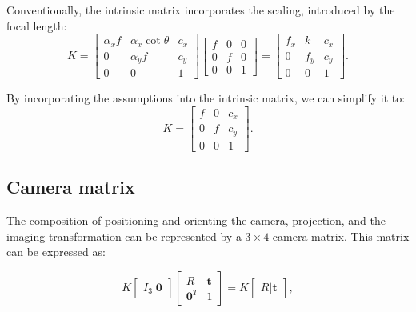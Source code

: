 Conventionally, the intrinsic matrix incorporates the scaling, introduced
by the focal length:
\begin{equation}
	K = \begin{bmatrix}
		\alpha_x f & \alpha_x \cot \theta & c_x \\
		0          & \alpha_y f           & c_y \\
		0          & 0                    & 1
	\end{bmatrix} \begin{bmatrix}
		f & 0 & 0 \\
		0 & f & 0 \\
		0 & 0 & 1
	\end{bmatrix} = \begin{bmatrix}
		f_x & k   & c_x \\
		0   & f_y & c_y \\
		0   & 0   & 1
	\end{bmatrix}.
\end{equation}

By incorporating the assumptions  into the intrinsic matrix,
we can simplify it to:
\begin{equation}
	K = \begin{bmatrix}
		f & 0 & c_x \\
		0 & f & c_y \\
		0 & 0 & 1
	\end{bmatrix}.
\end{equation}

\subsection{Camera matrix}\label{sub:camera_matrix}

The composition of positioning and orienting the camera, projection, and the
imaging transformation can be represented by a $3 \times 4$ camera
matrix. This matrix can be expressed as:

\begin{equation}
	K \begin{bmatrix}
		I_3 \vert \mathbf{0}
	\end{bmatrix} \begin{bmatrix}
		R              & \mathbf{t} \\
		\mathbf{0}^{T} & 1
	\end{bmatrix} = K \begin{bmatrix}
		R \vert \mathbf{t}
	\end{bmatrix},
\end{equation}

